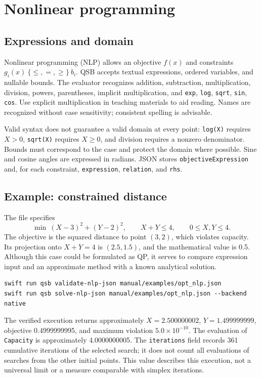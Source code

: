 \section{Nonlinear programming}
\subsection{Expressions and domain}
Nonlinear programming (NLP) allows an objective \(f(x)\) and constraints
\(g_i(x)\ \{\leq,=,\geq\}\ b_i\). QSB accepts textual expressions,
ordered variables, and nullable bounds. The evaluator recognizes addition,
subtraction, multiplication, division, powers, parentheses, implicit
multiplication, and \texttt{exp}, \texttt{log}, \texttt{sqrt}, \texttt{sin},
\texttt{cos}. Use explicit multiplication in teaching materials to aid reading.
Names are recognized without case sensitivity; consistent spelling is advisable.

Valid syntax does not guarantee a valid domain at every point:
\texttt{log(X)} requires \(X>0\), \texttt{sqrt(X)} requires \(X\geq0\), and
division requires a nonzero denominator. Bounds must correspond to the case
and protect the domain where possible. Sine and cosine angles are expressed
in radians. JSON stores \texttt{objectiveExpression} and, for each constraint,
\texttt{expression}, \texttt{relation}, and \texttt{rhs}.

\subsection{Example: constrained distance}
The file  specifies
\[
 \min\ (X-3)^2+(Y-2)^2,\qquad X+Y\leq4,\qquad0\leq X,Y\leq4.
\]
The objective is the squared distance to point \((3,2)\), which violates
capacity. Its projection onto \(X+Y=4\) is \((2.5,1.5)\), and the mathematical
value is 0.5. Although this case could be formulated as QP, it serves to
compare expression input and an approximate method with a known analytical
solution.
\begin{lstlisting}
swift run qsb validate-nlp-json manual/examples/opt_nlp.json
swift run qsb solve-nlp-json manual/examples/opt_nlp.json --backend native
\end{lstlisting}
The verified execution returns approximately
\(X=2.500000002\), \(Y=1.499999999\), objective 0.4999999995, and maximum
violation \(5.0\times10^{-10}\). The evaluation of \texttt{Capacity} is
approximately 4.0000000005. The \texttt{iterations} field records 361 cumulative
iterations of the selected search; it does not count all evaluations of
searches from the other initial points. This value describes this execution,
not a universal limit or a measure comparable with simplex iterations.

